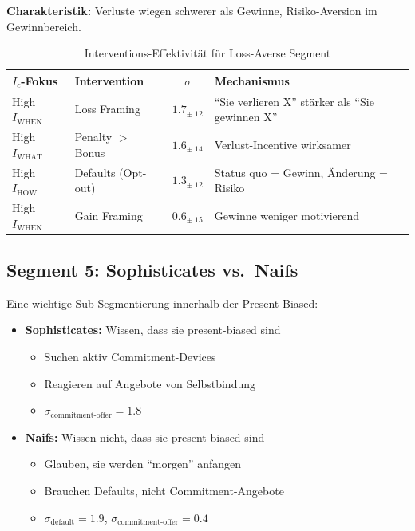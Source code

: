 \textbf{Charakteristik:} Verluste wiegen schwerer als Gewinne, Risiko-Aversion im Gewinnbereich.

\begin{table}[htbp]
\centering
\caption{Interventions-Effektivität für Loss-Averse Segment}
\label{tab:19-loss-averse}
\renewcommand{\arraystretch}{1.3}
\small
\begin{tabular}{@{}llcp{5cm}@{}}
\toprule
\textbf{$I_c$-Fokus} & \textbf{Intervention} & \textbf{$\sigma$} & \textbf{Mechanismus} \\
\midrule
High $I_{\text{WHEN}}$ & Loss Framing & \cellcolor{green!25}$1.7_{\pm.12}$ & ``Sie verlieren X'' st\"{a}rker als ``Sie gewinnen X'' \\
High $I_{\text{WHAT}}$ & Penalty $>$ Bonus & \cellcolor{green!25}$1.6_{\pm.14}$ & Verlust-Incentive wirksamer \\
High $I_{\text{HOW}}$ & Defaults (Opt-out) & $1.3_{\pm.12}$ & Status quo = Gewinn, \"{A}nderung = Risiko \\
High $I_{\text{WHEN}}$ & Gain Framing & $0.6_{\pm.15}$ & Gewinne weniger motivierend \\
\bottomrule
\end{tabular}
\end{table}

\subsection{Segment 5: Sophisticates vs.\ Naifs}

Eine wichtige Sub-Segmentierung innerhalb der Present-Biased:

\begin{itemize}
\item \textbf{Sophisticates:} Wissen, dass sie present-biased sind
  \begin{itemize}[nosep]
  \item Suchen aktiv Commitment-Devices
  \item Reagieren auf Angebote von Selbstbindung
  \item $\sigma_{\text{commitment-offer}} = 1.8$
  \end{itemize}

\item \textbf{Naifs:} Wissen nicht, dass sie present-biased sind
  \begin{itemize}[nosep]
  \item Glauben, sie werden ``morgen'' anfangen
  \item Brauchen Defaults, nicht Commitment-Angebote
  \item $\sigma_{\text{default}} = 1.9$, $\sigma_{\text{commitment-offer}} = 0.4$
  \end{itemize}
\end{itemize}


